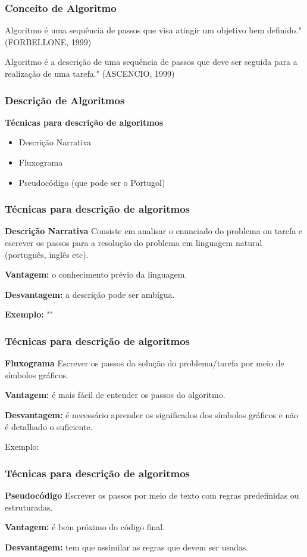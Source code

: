 \begin{frame}
	\frametitle{Conceito de Algoritmo}
	Algoritmo é uma sequência de passos que visa atingir um objetivo bem definido." (FORBELLONE, 1999)
	
	Algoritmo é a descrição de uma sequência de passos que deve ser seguida para a realização de uma tarefa." (ASCENCIO, 1999)
\end{frame}



\begin{frame}
	\frametitle{Descrição de Algoritmos}
	\textbf{Técnicas para descrição de algoritmos}
	\begin{itemize}
		\item Descrição Narrativa
		\item Fluxograma
		\item Pseudocódigo (que pode ser o Portugol)
	\end{itemize}
\end{frame}



\begin{frame}
	\frametitle{Técnicas para descrição de algoritmos}
	
	\begin{block}{\textbf{Descrição Narrativa}}
		Consiste em analisar o enunciado do problema ou tarefa e escrever os passos para a resolução do problema em linguagem natural (português, inglês etc).
	\end{block}
	
	\textbf{Vantagem:} o conhecimento prévio da linguagem.
	
	\textbf{Desvantagem:} a descrição pode ser ambígua.
	
	\textbf{Exemplo:} ""
\end{frame}

\begin{frame}
	\frametitle{Técnicas para descrição de algoritmos}
	
	\begin{block}{\textbf{Fluxograma}}
		Escrever os passos da solução do problema/tarefa por meio de símbolos gráficos.
	\end{block}
	
	\textbf{Vantagem:} é mais fácil de entender os passos do algoritmo.
	
	\textbf{Desvantagem:} é necessário aprender os significados dos símbolos gráficos e não é detalhado o suficiente.
	
	Exemplo:
\end{frame}


\begin{frame}
	\frametitle{Técnicas para descrição de algoritmos}
	
	\begin{block}{\textbf{Pseudocódigo}}
		Escrever os passos por meio de texto com regras predefinidas ou estruturadas.
	\end{block}
	
	\textbf{Vantagem:} é bem próximo do código final.
	
	\textbf{Desvantagem:} tem que assimilar as regras que devem ser usadas.
\end{frame}
